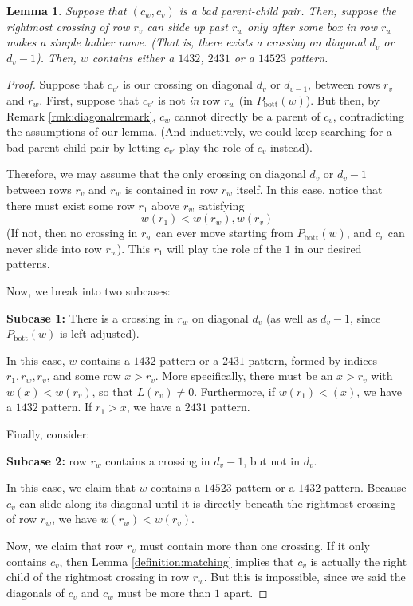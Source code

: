 \documentclass{article}
\newtheorem{lemma}[theorem]{Lemma}
\theoremstyle{definition} %
\begin{document}
\begin{lemma}\label{lemma:sufficientcase2}
    Suppose that $(c_w,c_v)$ is a bad parent-child pair. Then, suppose the rightmost crossing of row $r_v$ can slide up past $r_w$ only after some box in row $r_w$ makes a simple ladder move. (That is, there exists a crossing on diagonal $d_v$ or $d_{v}-1$). Then, $w$ contains either a $1432$, $2431$ or a $14523$ pattern.
\end{lemma}
\begin{proof}
    Suppose that $c_{v'}$ is our crossing on diagonal $d_v$ or $d_{v-1}$, between rows $r_v$ and $r_w$. First, suppose that $c_{v'}$ is not \textit{in} row $r_w$ (in $P_{\text{bott}}(w)$). But then, by Remark \ref{rmk:diagonalremark}, $c_w$ cannot directly be a parent of $c_v$, contradicting the assumptions of our lemma. (And inductively, we could keep searching for a bad parent-child pair by letting $c_{v'}$ play the role of $c_v$ instead).  
    

    Therefore, we may assume that the only crossing on diagonal $d_v$ or $d_{v}-1$ between rows $r_v$ and $r_w$ is contained in row $r_w$ itself. In this case, notice that there must exist some row $r_1$ above $r_w$ satisfying \[w(r_1)<w(r_w),w(r_v)\] 
    (If not, then no crossing in $r_w$ can ever move starting from $P_{\text{bott}}(w)$, and $c_v$ can never slide into row $r_w$). This $r_1$ will play the role of the $1$ in our desired patterns. 
    
    Now, we break into two subcases:

    \textbf{Subcase 1:} There is a crossing in $r_w$ on diagonal $d_v$ (as well as $d_{v}-1$, since $P_{\text{bott}}(w)$ is left-adjusted). 

    In this case, $w$ contains a $1432$ pattern or a $2431$ pattern, formed by indices $r_1, r_w, r_v$, and some row $x > r_v$. More specifically, there must be an $x > r_v$ with $w(x) < w(r_v)$, so that $L(r_v) \neq 0$. Furthermore, if $w(r_1) < (x)$, we have a $1432$ pattern. If $r_1 > x$, we have a $2431$ pattern. 
    
    Finally, consider:

    \textbf{Subcase 2:} row $r_w$ contains a crossing in $d_v-1$, but not in $d_v$. 

    In this case, we claim that $w$ contains a $14523$ pattern or a $1432$ pattern. Because $c_v$ can slide along its diagonal until it is directly beneath the rightmost crossing of row $r_w$, we have $w(r_w) < w(r_v)$.

    Now, we claim that row $r_v$ must contain more than one crossing. If it only contains $c_v$, then Lemma \ref{definition:matching} implies that $c_v$ is actually the right child of the rightmost crossing in row $r_w$. But this is impossible, since we said the diagonals of $c_v$ and $c_w$ must be more than $1$ apart. 


\end{proof}
\end{document}
